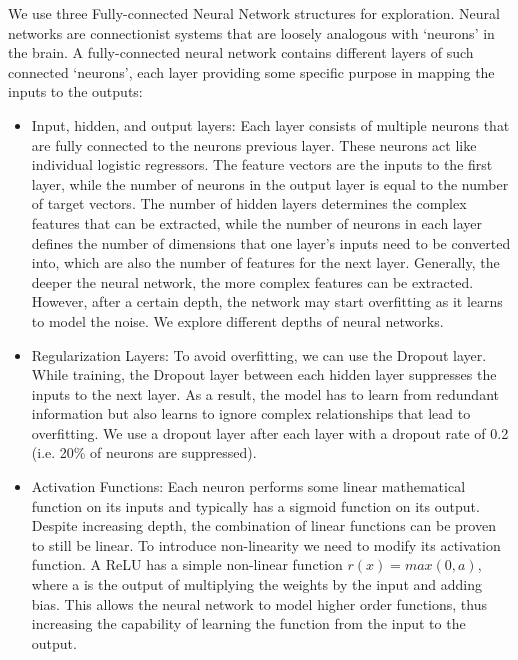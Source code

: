 \documentclass[runningheads,a4paper]{IEEEtran}
\begin{document}
We use three Fully-connected Neural Network structures for exploration. Neural networks are connectionist systems that are loosely analogous with `neurons' in the brain. A fully-connected neural network  contains different layers of such connected `neurons', each layer providing some specific purpose in mapping the inputs  to the outputs:
\begin{itemize}
\item Input, hidden, and output layers: Each layer consists of multiple neurons that are fully connected to the neurons previous layer. These neurons act like individual logistic regressors. The feature vectors are the inputs to the first layer, while the number of neurons in the output layer is equal to the number of target vectors. The number of hidden layers determines the complex features that can be extracted, while the number of neurons in each layer defines the number of dimensions that one layer's inputs need to be converted into, which are also the number of features for the next layer. Generally, the deeper the neural network, the more complex features can be extracted. However, after a certain depth, the network may start overfitting as it learns to model the noise. We explore different depths of neural networks.

\item Regularization Layers: To avoid overfitting, we can use the Dropout layer. While training, the Dropout layer between each hidden layer suppresses the inputs to the next layer. As a result, the model has to learn from redundant information but also learns to ignore complex relationships that lead to overfitting. We use a dropout layer after each layer with a dropout rate of 0.2 (i.e. 20\% of neurons are suppressed). 

\item Activation Functions: Each neuron performs some linear mathematical function on its inputs and typically has a sigmoid function on its output. Despite increasing depth, the combination of linear functions can be proven to still be linear. To introduce non-linearity we need to modify its activation function. A ReLU has a simple non-linear function $r(x) = max(0,a)$, where a is the output of multiplying the weights by the input and adding bias. This allows the neural network to model higher order functions, thus increasing the capability of learning the function from the input to the output.


\end{itemize}
\end{document}
